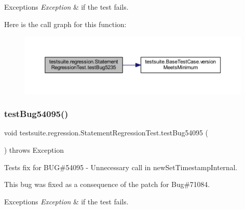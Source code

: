\begin{DoxyExceptions}{Exceptions}
{\em Exception} & if the test fails. \\
\hline
\end{DoxyExceptions}
Here is the call graph for this function\+:
\nopagebreak
\begin{figure}[H]
\begin{center}
\leavevmode
\includegraphics[width=350pt]{classtestsuite_1_1regression_1_1_statement_regression_test_ac43b204c22e7e37fa98b6bd22e3b18fc_cgraph}
\end{center}
\end{figure}
\mbox{\label{classtestsuite_1_1regression_1_1_statement_regression_test_a17a22ae1f0a93a72a1a4a4379cab692c}} 
\subsubsection{\texorpdfstring{test\+Bug54095()}{testBug54095()}}
{\footnotesize\ttfamily void testsuite.\+regression.\+Statement\+Regression\+Test.\+test\+Bug54095 (\begin{DoxyParamCaption}{ }\end{DoxyParamCaption}) throws Exception}

Tests fix for B\+UG\#54095 -\/ Unnecessary call in new\+Set\+Timestamp\+Internal.

This bug was fixed as a consequence of the patch for Bug\#71084.


\begin{DoxyExceptions}{Exceptions}
{\em Exception} & if the test fails. \\
\hline
\end{DoxyExceptions}
\mbox{\label{classtestsuite_1_1regression_1_1_statement_regression_test_ad893290c719e6320a980acdd172851e7}} 
